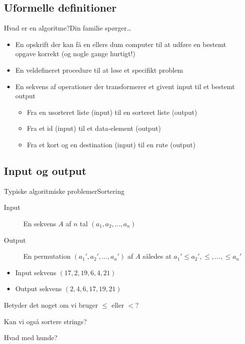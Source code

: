 \documentclass{beamer}
\begin{document}
\subsection{Uformelle definitioner}

\begin{frame}{Hvad er en algoritme?}{Din familie spørger\ldots}
    \pause
    \begin{itemize}
        \item En \alert{opskrift} der kan få en ellers dum computer til at
            udføre en bestemt opgave korrekt (og nogle gange hurtigt!) \pause
        \item En \alert{veldefineret procedure} til at løse et specifikt problem
            \pause
        \item En sekvens af \alert{operationer} der transformerer et givent
            \alert{input} til et bestemt \alert{output}
            \begin{itemize}
                \item Fra en usorteret liste (input) til en sorteret liste
                    (output)
                \item Fra et id (input) til et data-element (output)
                \item Fra et kort og en destination (input) til en rute (output)
            \end{itemize}
    \end{itemize}
\end{frame}

\subsection{Input og output}

\begin{frame}{Typiske algoritmiske problemer}{Sortering}
    \begin{description}
        \item[Input] En sekvens $A$ af $n$ tal $(a_1, a_2, \ldots, a_n)$
            \pause
        \item[Output] En permutation $(a_1', a_2', \ldots, a_n')$ af $A$ således
            at $a_1' \leq a_2', \leq, \ldots, \leq a_n'$ \pause
    \end{description}

    \begin{example}
        \begin{itemize}
            \item Input sekvens $(17, 2, 19, 6, 4, 21)$ \\
            \item Output sekvens $(2, 4, 6, 17, 19, 21)$
        \end{itemize}
    \end{example}

    \pause
    Betyder det noget om vi bruger $\leq$ eller $<$?

    \pause
    Kan vi også sortere strings?

    \pause
    Hvad med hunde?

\end{frame}
\end{document}
